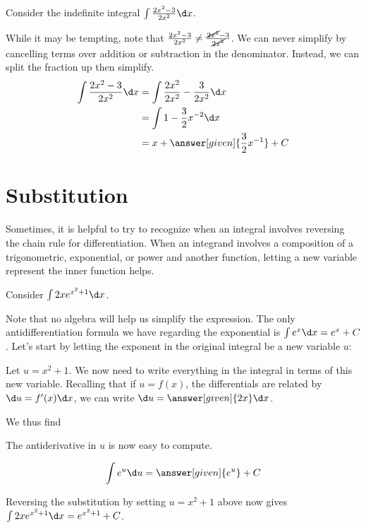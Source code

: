 \documentclass[nooutcomes]{ximera}
\begin{document}
 
\begin{example}
Consider the indefinite integral $\int \frac{2x^2-3}{2x^2} \d x$.  

While it may be tempting, note that $\frac{2x^2-3}{2x^2} \neq \frac{\cancel{2x^2}-3}{\cancel{2x^2}}$.  We can never simplify by cancelling terms over addition or subtraction in the denominator.  Instead, we can split the fraction up then simplify.
\begin{align*}
\int \frac{2x^2-3}{2x^2} \d x &=\int \frac{2x^2}{2x^2}-\frac{3}{2x^2} \d x \\
&=  \int 1-\frac{3}{2}x^{-2} \d x \\
&= x+ \answer[given]{\frac{3}{2}x^{-1}}+C
\end{align*}

\end{example}

  
\section{Substitution}

Sometimes, it is helpful to try to recognize when an integral involves reversing the chain rule for differentiation. When an integrand involves a composition of a trigonometric, exponential, or power and another function, letting a new variable represent the inner function helps.

\begin{example}
Consider $\int 2x e^{x^2+1} \d x$.  

Note that no algebra will help us simplify the expression.  The only antidifferentiation formula we have regarding the exponential is $\int e^x \d x = e^x +C$.  Let's start by letting the exponent in the original integral be a new variable $u$:

Let $u= x^2+1$.  We now need to write everything in the integral in terms of this new variable.  Recalling that if $u = f(x)$, the differentials are related by $\d u = f'(x) \d x$, we can write $\d u = \answer[given]{2x} \d x$.

We thus find

\begin{image}
  \end{image}




The antiderivative in $u$ is now easy to compute.  

\[ \int e^u \d u = \answer[given]{e^u}+C \]

Reversing the substitution by setting $u=x^2+1$ above  now gives $\int 2xe^{x^2+1} \d x = e^{x^2+1}+C$.

\end{example}
\end{document}

